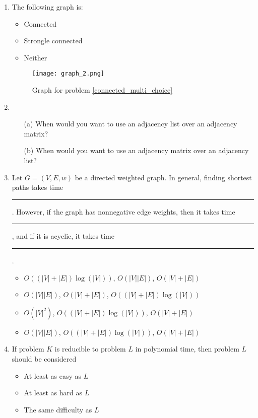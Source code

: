 \documentclass[12pt]{article}
\begin{document}
\newpage
\begin{enumerate}
    \item The following graph is:
    \begin{itemize}
        \item Connected
        \item Strongle connected
        \item Neither
    \end{itemize}
    \label{connected_multi_choice}
    \begin{figure}[h]
        \centering
        \caption{Graph for problem \ref{connected_multi_choice}}
        \texttt{[image: graph\_2.png]}
    \end{figure}
    \item 
        \begin{itemize}
            \item[(a)] When would you want to use an adjacency list over an adjacency matrix? \vspace{4cm}
            \item[(b)] When would you want to use an adjacency matrix over an adjacency list? \vspace{4cm}
        \end{itemize}
    \item Let $G = (V,E,w)$ be a directed weighted graph. In general, finding shortest paths takes time \rule{1cm}{0.15mm}. However, if the graph has nonnegative edge weights, then it takes time \rule{1cm}{0.15mm}, and if it is acyclic, it takes time \rule{1cm}{0.15mm}. 
    \begin{itemize}
        \item $O((|V|+|E|)\log(|V|))$, $O(|V||E|)$, $O(|V|+|E|)$
        \item $O(|V||E|)$, $O(|V|+|E|)$, $O((|V|+|E|)\log(|V|))$
        \item $O(|V|^2)$, $O((|V|+|E|)\log(|V|))$, $O(|V|+|E|)$
        \item $O(|V||E|)$, $O((|V|+|E|)\log(|V|))$, $O(|V|+|E|)$
    \end{itemize} 
    \newpage
    \item If problem $K$ is reducible to problem $L$ in polynomial time, then problem $L$ should be considered
    \begin{itemize}
        \item At least as easy as $L$
        \item At least as hard as $L$
        \item The same difficulty as $L$

\end{itemize}
\end{enumerate}
\end{document}
